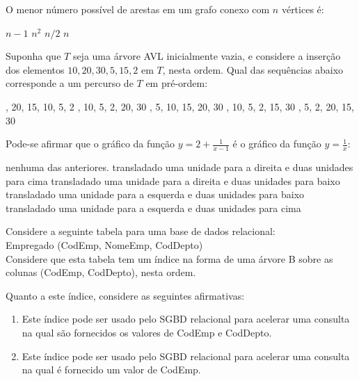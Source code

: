 \documentclass[12pt, addpoints]{exam}
\begin{document}
\begin{questions}
O menor número possível de arestas em um grafo conexo com \( n \) vértices é:
\begin{choices}
\choice \( n - 1 \)
\choice \( n^2 \)
\choice \( n/2 \)
\choice \( n \)
\end{choices}

\question

Suponha que \( T \) seja uma árvore AVL inicialmente vazia, e considere a inserção dos elementos \(10, 20, 30, 5, 15, 2\) em \( T \), nesta ordem. Qual das sequências abaixo corresponde a um percurso de \( T \) em pré-ordem:
\begin{choices}
, 20, 15, 10, 5, 2
, 10, 5, 2, 20, 30
, 5, 10, 15, 20, 30
, 10, 5, 2, 15, 30
, 5, 2, 20, 15, 30
\end{choices}

\question

Pode-se afirmar que o gráfico da função \(y = 2 + \frac{1}{x - 1}\) é o gráfico da função \(y = \frac{1}{x}\):
\begin{choices}
\choice nenhuma das anteriores.
\choice transladado uma unidade para a direita e duas unidades para cima
\choice transladado uma unidade para a direita e duas unidades para baixo
\choice transladado uma unidade para a esquerda e duas unidades para baixo
\choice transladado uma unidade para a esquerda e duas unidades para cima
\end{choices}

\question

Considere a seguinte tabela para uma base de dados relacional:\\

Empregado (CodEmp, NomeEmp, CodDepto)\\

Considere que esta tabela tem um índice na forma de uma árvore B sobre as colunas (CodEmp, CodDepto), nesta ordem.

Quanto a este índice, considere as seguintes afirmativas:

\begin{enumerate}

    \item Este índice pode ser usado pelo SGBD relacional para acelerar uma consulta na qual são fornecidos os valores de CodEmp e CodDepto.

    \item Este índice pode ser usado pelo SGBD relacional para acelerar uma consulta na qual é fornecido um valor de CodEmp.


\end{enumerate}
\end{questions}
\end{document}
